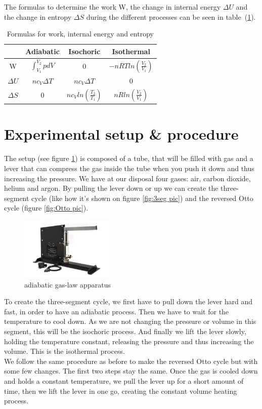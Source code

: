 \documentclass{scrartcl}
\begin{document}
The formulas to determine the work W, the change in internal energy $\Delta U$ and the change in entropy $\Delta S$ during the different processes can be seen in table~(\ref{tab:formulas}).\cite{adiabaticIndex}\cite{isochoricProcess}\cite{isothermalProcess}
\begin{table}[!ht]
    \centering
    \begin{tabular}{c|ccc}
         & Adiabatic & Isochoric & Isothermal  \\ \hline
        W & $\int_{V_1}^{V_2} p dV$ & 0 & $-nRTln(\frac{V_2}{V_1})$ \\ \hline
        $\Delta U$ & $n c_V \Delta T$ & $n c_V \Delta T$ & 0 \\ \hline
        $\Delta S$ & 0 & $nc_Vln(\frac{T_2}{T_1})$ & $nRln(\frac{V_2}{V_1})$
    \end{tabular}
    \caption{Formulas for work, internal energy and entropy}
    \label{tab:formulas}
\end{table}

\section{Experimental setup \& procedure}
The setup (see figure \ref{fig:setup}) is composed of a tube, that will be filled with gas and a lever that can compress the gas inside the tube when you push it down and thus increasing the pressure. We have at our disposal four gases: air, carbon dioxide, helium and argon. By pulling the lever down or up we can create the three-segment cycle (like how it's shown on figure \ref{fig:3seg pic}) and the reversed Otto cycle (figure \ref{fig:Otto pic}).\\
\begin{figure}
    \includegraphics[width=0.4\textwidth]{Setup/md_gJyTdLSiaUR8.png}
    \caption{adiabatic gas-law apparatus}
    \label{fig:setup}
\end{figure}
To create the three-segment cycle, we first have to pull down the lever hard and fast, in order to have an adiabatic process. Then we have to wait for the temperature to cool down. As we are not changing the pressure or volume in this segment, this will be the isochoric process. And finally we lift the lever slowly, holding the temperature constant, releasing the pressure and thus increasing the volume. This is the isothermal process.\\
We follow the same procedure as before to make the reversed Otto cycle but with some few changes. The first two steps stay the same. Once the gas is cooled down and holds a constant temperature, we pull the lever up for a short amount of time, then we lift the lever in one go, creating the constant volume heating process.
\end{document}
